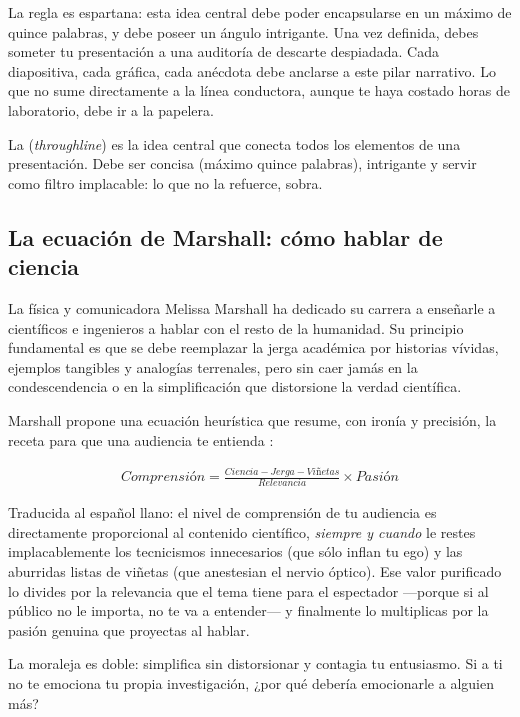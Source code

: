 La regla es espartana: esta idea central debe poder encapsularse en un máximo de quince palabras, y debe poseer un ángulo intrigante.
Una vez definida, debes someter tu presentación a una auditoría de descarte despiadada.
Cada diapositiva, cada gráfica, cada anécdota debe anclarse a este pilar narrativo.
Lo que no sume directamente a la línea conductora, aunque te haya costado horas de laboratorio, debe ir a la papelera.

\begin{remember}
	\label{rem:throughline}
	La  (\emph{throughline}) es la idea central que conecta todos los elementos de una presentación.
	Debe ser concisa (máximo quince palabras), intrigante y servir como filtro implacable: lo que no la refuerce, sobra.
\end{remember}

\subsection*{La ecuación de Marshall: cómo hablar de ciencia}

La física y comunicadora Melissa Marshall ha dedicado su carrera a enseñarle a científicos e ingenieros a hablar con el resto de la humanidad.
Su principio fundamental es que se debe reemplazar la jerga académica por historias vívidas, ejemplos tangibles y analogías terrenales, pero sin caer jamás en la condescendencia o en la simplificación que distorsione la verdad científica.

Marshall propone una ecuación heurística que resume, con ironía y precisión, la receta para que una audiencia te entienda \cite{Marshall2012}:

\begin{align*}
	\textit{Comprensión} = \frac{\textit{Ciencia} - \textit{Jerga} - \textit{Viñetas}}{\textit{Relevancia}} \times \textit{Pasión}
\end{align*}

Traducida al español llano: el nivel de comprensión de tu audiencia es directamente proporcional al contenido científico, \emph{siempre y cuando} le restes implacablemente los tecnicismos innecesarios (que sólo inflan tu ego) y las aburridas listas de viñetas (que anestesian el nervio óptico).
Ese valor purificado lo divides por la relevancia que el tema tiene para el espectador —porque si al público no le importa, no te va a entender— y finalmente lo multiplicas por la pasión genuina que proyectas al hablar.

La moraleja es doble: simplifica sin distorsionar y contagia tu entusiasmo.
Si a ti no te emociona tu propia investigación, ¿por qué debería emocionarle a alguien más?


